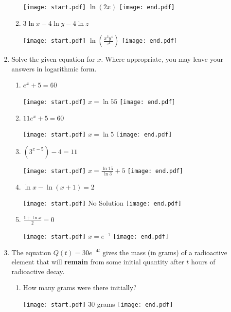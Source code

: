 \documentclass[12pt]{article}
\begin{document}
\begin{enumerate}
\begin{enumerate}
\texttt{[image: start.pdf]}
{$\ln{(2x)}$}
\texttt{[image: end.pdf]}

 
\item $\displaystyle 3\ln{x}+4\ln{y}-4\ln{z}$

\texttt{[image: start.pdf]}
{$\displaystyle \ln{\left(\frac{x^{3}y^{4}}{z^{4}}\right)}$}
\texttt{[image: end.pdf]}


\end{enumerate}

\item Solve the given equation for $x$.  Where appropriate, you may leave your answers in logarithmic form.

\begin{enumerate}

\item $\displaystyle e^{x}+5=60$

\texttt{[image: start.pdf]}
{$x=\ln{55}$}
\texttt{[image: end.pdf]}


\item $\displaystyle 11e^{x}+5=60$

\texttt{[image: start.pdf]}
{$x=\ln{5}$}
\texttt{[image: end.pdf]}


\item $\displaystyle \left(3^{x-5}\right)-4=11$

\texttt{[image: start.pdf]}
{$\displaystyle x=\frac{\ln{15}}{\ln{3}}+5$}
\texttt{[image: end.pdf]}


\item $\displaystyle \ln{x}-\ln{(x+1)}=2$

\texttt{[image: start.pdf]}
{No Solution}
\texttt{[image: end.pdf]}


\item $\displaystyle \frac{1+\ln{x}}{2}=0$

\texttt{[image: start.pdf]}
{$\displaystyle x=e^{-1}$}
\texttt{[image: end.pdf]}


\end{enumerate}

\item The equation $Q(t)=30e^{-4t}$ gives the mass (in grams) of a radioactive element that will {\bf remain} from some initial quantity after $t$ hours of radioactive decay.

\begin{enumerate}

\item How many grams were there initially?

\texttt{[image: start.pdf]}
{30 grams}
\texttt{[image: end.pdf]}



\end{enumerate}
\end{enumerate}
\end{document}
